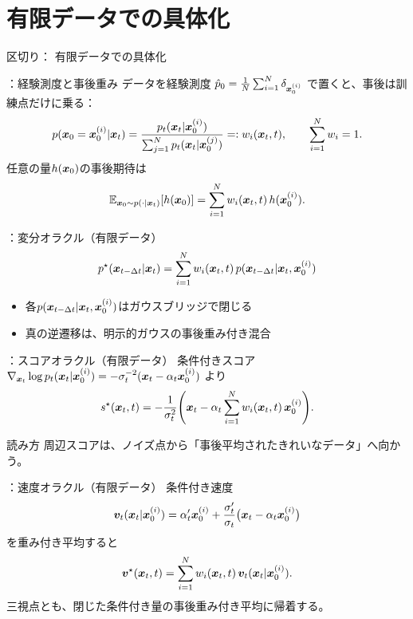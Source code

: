 \section{有限データでの具体化}
\assuppl
\begin{frame}{区切り：\supplmark\; 有限データでの具体化}
    \tableofcontents[currentsection]
\end{frame}
\assuppl
\begin{frame}{\supplmark：経験測度と事後重み}
    データを経験測度
    $\hat{p}_0=\frac{1}{N}\sum_{i=1}^{N}\delta_{\bm{x}_0^{(i)}}$
    で置くと、事後は訓練点だけに乗る：
    \[
        p(\bm{x}_0=\bm{x}_0^{(i)}|\bm{x}_t)
        =
        \frac{p_t(\bm{x}_t|\bm{x}_0^{(i)})}
             {\sum_{j=1}^{N}p_t(\bm{x}_t|\bm{x}_0^{(j)})}
        =:
        w_i(\bm{x}_t,t),
        \qquad
        \sum_{i=1}^{N}w_i=1.
    \]
    任意の量$h(\bm{x}_0)$の事後期待は
    \[
        \mathbb{E}_{\bm{x}_0\sim p(\cdot|\bm{x}_t)}[h(\bm{x}_0)]
        =
        \sum_{i=1}^{N}w_i(\bm{x}_t,t)\,h(\bm{x}_0^{(i)}).
    \]
\end{frame}
\assuppl
\begin{frame}{\supplmark：変分オラクル（有限データ）}
    \[
        p^\star(\bm{x}_{t-\Delta t}|\bm{x}_t)
        =
        \sum_{i=1}^{N}
        w_i(\bm{x}_t,t)\,
        p(\bm{x}_{t-\Delta t}|\bm{x}_t,\bm{x}_0^{(i)})
    \]
    \begin{itemize}
        \item 各$p(\bm{x}_{t-\Delta t}|\bm{x}_t,\bm{x}_0^{(i)})$はガウスブリッジで閉じる
        \item 真の逆遷移は、明示的ガウスの事後重み付き混合
    \end{itemize}
\end{frame}
\assuppl
\begin{frame}{\supplmark：スコアオラクル（有限データ）}
    条件付きスコア
    $\nabla_{\bm{x}_t}\log p_t(\bm{x}_t|\bm{x}_0^{(i)})
    =-\sigma_t^{-2}(\bm{x}_t-\alpha_t\bm{x}_0^{(i)})$
    より
    \[
        s^\star(\bm{x}_t,t)
        =
        -\frac{1}{\sigma_t^{2}}
        \Biggl(
        \bm{x}_t
        -
        \alpha_t
        \sum_{i=1}^{N}w_i(\bm{x}_t,t)\,\bm{x}_0^{(i)}
        \Biggr).
    \]
    \begin{exampleblock}{読み方}
        周辺スコアは、ノイズ点から「事後平均されたきれいなデータ」へ向かう。
    \end{exampleblock}
\end{frame}
\assuppl
\begin{frame}{\supplmark：速度オラクル（有限データ）}
    条件付き速度
    \[
        \bm{v}_t(\bm{x}_t|\bm{x}_0^{(i)})
        =
        \alpha_t'\bm{x}_0^{(i)}
        +
        \frac{\sigma_t'}{\sigma_t}
        \bigl(\bm{x}_t-\alpha_t\bm{x}_0^{(i)}\bigr)
    \]
    を重み付き平均すると
    \[
        \bm{v}^\star(\bm{x}_t,t)
        =
        \sum_{i=1}^{N}
        w_i(\bm{x}_t,t)\,
        \bm{v}_t(\bm{x}_t|\bm{x}_0^{(i)}).
    \]
    三視点とも、閉じた条件付き量の事後重み付き平均に帰着する。
\end{frame}
